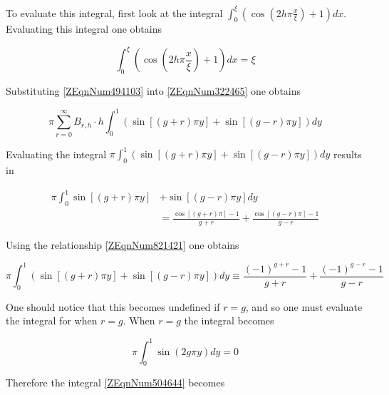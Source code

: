 \documentclass{article}
\begin{document}
To evaluate this integral, first look at the integral $\int _{0}^{\xi} 
\left(\cos \left(2h\pi \frac{x}{\xi } \right)+1\right) dx$. Evaluating this
integral one obtains

\begin{equation} \label{ZEqnNum494103} \int _{0}^{\xi } \left(\cos \left(2h\pi
\frac{x}{\xi } \right)+1\right) dx=\xi \end{equation}

Substituting \eqref{ZEqnNum494103} into \eqref{ZEqnNum322465} one obtains

\begin{equation} \label{ZEqnNum504644} \pi \sum _{r=0}^{\infty }B_{r,h} \cdot
h\int _{0}^{1} \left(\sin \left[\left(g+r\right)\pi y\right]+\sin
\left[\left(g-r\right)\pi y\right]\right) dy \end{equation}

Evaluating the integral $\pi \int _{0}^{1} \left(\sin \left[\left(g+r\right)\pi
y\right]+\sin \left[\left(g-r\right)\pi y\right]\right) dy$ results in

\begin{equation*} \begin{split}
    \pi \int _{0}^{1} \sin \left[\left(g + r\right)\pi y\right]
    & + \sin \left[\left(g - r\right) \pi y\right] dy \\
    & = \frac{\cos \left[\left(g + r\right)\pi \right] - 1}{g + r} 
    + \frac{\cos \left[\left(g - r \right) \pi \right] - 1}{g - r} 
\end{split} \end{equation*} 

Using the relationship \eqref{ZEqnNum821421} one obtains

\begin{equation*}
    \pi \int _{0}^{1} \left(\sin \left[\left(g+r\right)\pi y\right]+\sin
    \left[\left(g-r\right)\pi y\right]\right) dy\equiv \frac{\left(-1\right)^{g+r}
    -1}{g+r} +\frac{\left(-1\right)^{g-r} -1}{g-r} 
\end{equation*}

One should notice that this becomes undefined if $r=g$, and so one must evaluate
the integral for when $r=g$. When $r=g$ the integral becomes

\begin{equation*}
    \pi \int _{0}^{1} \sin \left(2g\pi y\right) dy = 0
\end{equation*} 

 Therefore the integral \eqref{ZEqnNum504644} becomes
\end{document}
